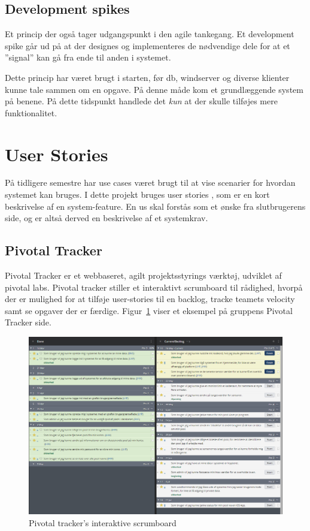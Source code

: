 \subsection{Development spikes}
Et princip der også tager udgangspunkt i den agile tankegang. Et development spike \cite{scaledagile} går ud på at der designes og implementeres de nødvendige dele for at et ''signal'' kan gå fra ende til anden i systemet.

Dette princip har været brugt i starten, før \gls{db}, \gls{windserver} og diverse klienter kunne tale sammen om en opgave. På denne måde kom et grundlæggende system på benene. På dette tidspunkt handlede det \textit{kun} at der skulle tilføjes mere funktionalitet.

\section{User Stories}
På tidligere semestre har use cases været brugt til at vise scenarier for hvordan systemet kan bruges. I dette projekt bruges user stories \cite{margaretrouse2015}, som er en kort beskrivelse af en system-feature. En \gls{us} skal forstås som et ønske fra slutbrugerens side, og er altså derved en beskrivelse af et systemkrav.

\subsection{Pivotal Tracker}
Pivotal Tracker er et webbaseret, agilt projektsstyrings værktøj, udviklet af pivotal labs. Pivotal tracker stiller et interaktivt scrumboard til rådighed, hvorpå der er mulighed for at tilføje user-stories til en backlog, tracke teamets velocity samt se opgaver der er færdige. Figur~\ref{fig:scrumboard} viser et eksempel på gruppens Pivotal Tracker side.

\begin{figure}
	\centering
	\includegraphics[width=\linewidth]{figs/processProjektGennemforsel/scrumboard.PNG}
	\caption{Pivotal tracker's interaktive scrumboard}
	\label{fig:scrumboard}
\end{figure}

